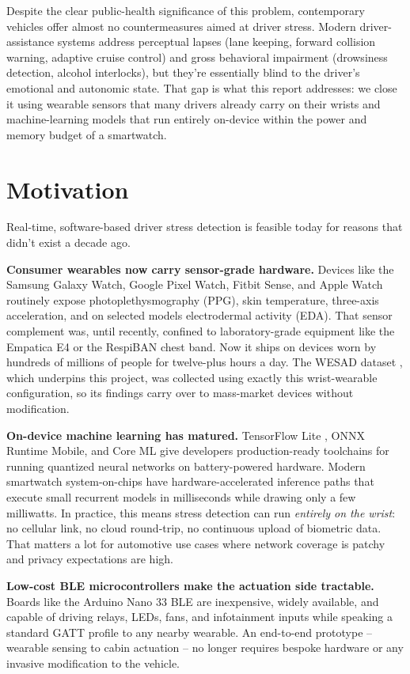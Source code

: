 Despite the clear public-health significance of this problem,
contemporary vehicles offer almost no countermeasures aimed at
driver stress. Modern driver-assistance systems address perceptual
lapses (lane keeping, forward collision warning, adaptive cruise
control) and gross behavioral impairment (drowsiness detection,
alcohol interlocks), but they're essentially blind to the driver's
emotional and autonomic state. That gap is what this report addresses:
we close it using wearable sensors that many drivers already carry on
their wrists and machine-learning models that run entirely on-device
within the power and memory budget of a smartwatch.

\section{Motivation}
\label{sec:motivation}

Real-time, software-based driver stress detection is feasible today
for reasons that didn't exist a decade ago.

\textbf{Consumer wearables now carry sensor-grade hardware.}
Devices like the Samsung Galaxy Watch, Google Pixel Watch, Fitbit
Sense, and Apple Watch routinely expose photoplethysmography (PPG),
skin temperature, three-axis acceleration, and on selected models
electrodermal activity (EDA). That sensor complement was, until
recently, confined to laboratory-grade equipment like the Empatica
E4 or the RespiBAN chest band. Now it ships on devices worn by
hundreds of millions of people for twelve-plus hours a day. The
WESAD dataset \citep{schmidt2018wesad}, which underpins this project,
was collected using exactly this wrist-wearable configuration, so
its findings carry over to mass-market devices without modification.

\textbf{On-device machine learning has matured.}
TensorFlow Lite \citep{tflite2023}, ONNX Runtime Mobile, and Core ML
give developers production-ready toolchains for running quantized
neural networks on battery-powered hardware. Modern smartwatch
system-on-chips have hardware-accelerated inference paths that execute
small recurrent models in milliseconds while drawing only a few
milliwatts. In practice, this means stress detection can run
\emph{entirely on the wrist}: no cellular link, no cloud round-trip,
no continuous upload of biometric data. That matters a lot for
automotive use cases where network coverage is patchy and privacy
expectations are high.

\textbf{Low-cost BLE microcontrollers make the actuation side tractable.}
Boards like the Arduino Nano 33 BLE are inexpensive, widely available,
and capable of driving relays, LEDs, fans, and infotainment inputs while
speaking a standard GATT profile to any nearby wearable. An end-to-end
prototype -- wearable sensing to cabin actuation -- no longer requires
bespoke hardware or any invasive modification to the vehicle.

